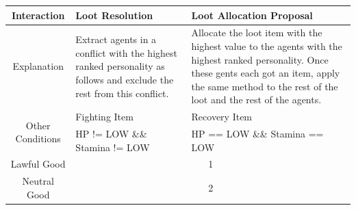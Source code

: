 \begin{table}[htb]
    \centering
    \small
    \begin{tabular}{ |c|p{16em}|p{16em}| }
        \hline
        Interaction                       & Loot Resolution                                                                                                      & Loot Allocation Proposal                                                                                                                                                                                      \\
        \hline
        Explanation                       & Extract agents in a conflict with the highest ranked personality as follows and exclude the rest from this conflict. & Allocate the loot item with the highest value to the agents with the highest ranked personality. Once these gents each got an item, apply the same method to the rest of the loot and the rest of the agents. \\
        \hline
        \multirow{2}{*}{Other Conditions} & Fighting Item                                                                                                        & Recovery Item                                                                                                                                                                                                 \\
        \cline{2-3}
                                          & HP != LOW \&\& Stamina != LOW                                                                                        & HP == LOW \&\& Stamina == LOW                                                                                                                                                                                 \\
        \hline
        Lawful Good                       & \multicolumn{2}{c|}{1}                                                                                                                                                                                                                                                                                                               \\
        \hline
        Neutral Good                      & \multicolumn{2}{c|}{2}                                                                                                                                                                                                                                                                                                               \\

\end{tabular}
\end{table}
